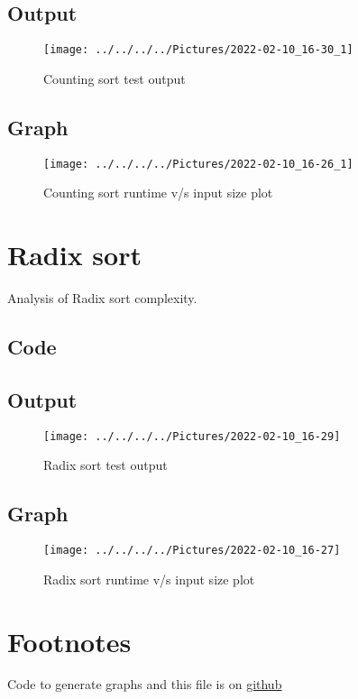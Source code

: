 \documentclass{article}
\begin{document}
    \subsection{Output}
    \begin{figure}[H]
        \centering
        \texttt{[image: ../../../../Pictures/2022-02-10\_16-30\_1]}
        \caption{Counting sort test output}
    \end{figure}

    \subsection{Graph}
    \begin{figure}[H]
        \centering
        \texttt{[image: ../../../../Pictures/2022-02-10\_16-26\_1]}
        \caption{Counting sort runtime v/s input size plot}
    \end{figure}

    \section{Radix sort}
    Analysis of Radix sort complexity.
    \subsection{Code}
    

    \subsection{Output}
    \begin{figure}[H]
        \centering
        \texttt{[image: ../../../../Pictures/2022-02-10\_16-29]}
        \caption{Radix sort test output}
    \end{figure}

    \subsection{Graph}
    \begin{figure}[H]
        \centering
        \texttt{[image: ../../../../Pictures/2022-02-10\_16-27]}
        \caption{Radix sort runtime v/s input size plot}
    \end{figure}

    \section{Footnotes}
    Code to generate graphs and this file is on \href{https://github.com/pranavgade20/algos_complexity_benchmarker}{github}
\end{document}
